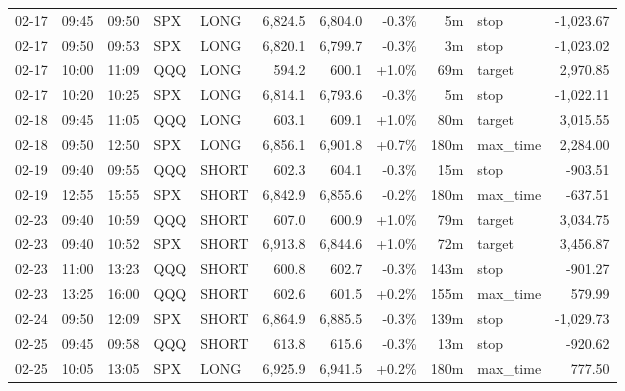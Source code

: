 \documentclass[11pt,a4paper,twoside]{article}
\begin{document}
\begin{center}
\begin{longtable}{>{\color{txtmain}}l l l l l r r r r >{\color{txtmain}}l r}
02-17 & 09:45 & 09:50 & SPX & LONG & 6,824.5 & 6,804.0 & \textcolor{lossred}{-0.3\%} & 5m & stop & \textcolor{lossred}{-1,023.67} \\
02-17 & 09:50 & 09:53 & SPX & LONG & 6,820.1 & 6,799.7 & \textcolor{lossred}{-0.3\%} & 3m & stop & \textcolor{lossred}{-1,023.02} \\
02-17 & 10:00 & 11:09 & QQQ & LONG & 594.2 & 600.1 & \textcolor{wingreen}{+1.0\%} & 69m & target & \textcolor{wingreen}{2,970.85} \\
02-17 & 10:20 & 10:25 & SPX & LONG & 6,814.1 & 6,793.6 & \textcolor{lossred}{-0.3\%} & 5m & stop & \textcolor{lossred}{-1,022.11} \\
02-18 & 09:45 & 11:05 & QQQ & LONG & 603.1 & 609.1 & \textcolor{wingreen}{+1.0\%} & 80m & target & \textcolor{wingreen}{3,015.55} \\
02-18 & 09:50 & 12:50 & SPX & LONG & 6,856.1 & 6,901.8 & \textcolor{wingreen}{+0.7\%} & 180m & max\_time & \textcolor{wingreen}{2,284.00} \\
02-19 & 09:40 & 09:55 & QQQ & SHORT & 602.3 & 604.1 & \textcolor{lossred}{-0.3\%} & 15m & stop & \textcolor{lossred}{-903.51} \\
02-19 & 12:55 & 15:55 & SPX & SHORT & 6,842.9 & 6,855.6 & \textcolor{lossred}{-0.2\%} & 180m & max\_time & \textcolor{lossred}{-637.51} \\
02-23 & 09:40 & 10:59 & QQQ & SHORT & 607.0 & 600.9 & \textcolor{wingreen}{+1.0\%} & 79m & target & \textcolor{wingreen}{3,034.75} \\
02-23 & 09:40 & 10:52 & SPX & SHORT & 6,913.8 & 6,844.6 & \textcolor{wingreen}{+1.0\%} & 72m & target & \textcolor{wingreen}{3,456.87} \\
02-23 & 11:00 & 13:23 & QQQ & SHORT & 600.8 & 602.7 & \textcolor{lossred}{-0.3\%} & 143m & stop & \textcolor{lossred}{-901.27} \\
02-23 & 13:25 & 16:00 & QQQ & SHORT & 602.6 & 601.5 & \textcolor{wingreen}{+0.2\%} & 155m & max\_time & \textcolor{wingreen}{579.99} \\
02-24 & 09:50 & 12:09 & SPX & SHORT & 6,864.9 & 6,885.5 & \textcolor{lossred}{-0.3\%} & 139m & stop & \textcolor{lossred}{-1,029.73} \\
02-25 & 09:45 & 09:58 & QQQ & SHORT & 613.8 & 615.6 & \textcolor{lossred}{-0.3\%} & 13m & stop & \textcolor{lossred}{-920.62} \\
02-25 & 10:05 & 13:05 & SPX & LONG & 6,925.9 & 6,941.5 & \textcolor{wingreen}{+0.2\%} & 180m & max\_time & \textcolor{wingreen}{777.50} \\

\end{longtable}
\end{center}
\end{document}
